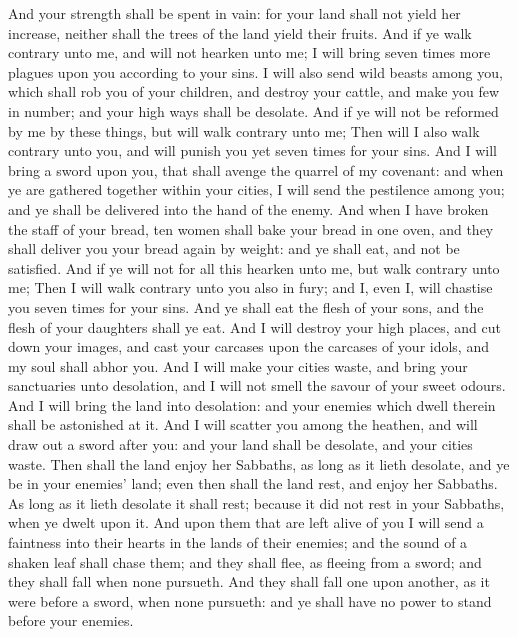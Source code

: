 \begin{biblechapter}
\verse And your strength shall be spent in vain: for your land shall not yield her increase, neither shall the trees of the land yield their fruits.
\verse And if ye walk contrary unto me, and will not hearken unto me; I will bring seven times more plagues upon you according to your sins.
\verse I will also send wild beasts among you, which shall rob you of your children, and destroy your cattle, and make you few in number; and your high ways shall be desolate.
\verse And if ye will not be reformed by me by these things, but will walk contrary unto me;
\verse Then will I also walk contrary unto you, and will punish you yet seven times for your sins.
\verse And I will bring a sword upon you, that shall avenge the quarrel of my covenant: and when ye are gathered together within your cities, I will send the pestilence among you; and ye shall be delivered into the hand of the enemy.
\verse And when I have broken the staff of your bread, ten women shall bake your bread in one oven, and they shall deliver you your bread again by weight: and ye shall eat, and not be satisfied.
\verse And if ye will not for all this hearken unto me, but walk contrary unto me;
\verse Then I will walk contrary unto you also in fury; and I, even I, will chastise you seven times for your sins.
\verse And ye shall eat the flesh of your sons, and the flesh of your daughters shall ye eat.
\verse And I will destroy your high places, and cut down your images, and cast your carcases upon the carcases of your idols, and my soul shall abhor you.
\verse And I will make your cities waste, and bring your sanctuaries unto desolation, and I will not smell the savour of your sweet odours.
\verse And I will bring the land into desolation: and your enemies which dwell therein shall be astonished at it.
\verse And I will scatter you among the heathen, and will draw out a sword after you: and your land shall be desolate, and your cities waste.
\verse Then shall the land enjoy her Sabbaths, as long as it lieth desolate, and ye be in your enemies' land; even then shall the land rest, and enjoy her Sabbaths.
\verse As long as it lieth desolate it shall rest; because it did not rest in your Sabbaths, when ye dwelt upon it.
\verse And upon them that are left alive of you I will send a faintness into their hearts in the lands of their enemies; and the sound of a shaken leaf shall chase them; and they shall flee, as fleeing from a sword; and they shall fall when none pursueth.
\verse And they shall fall one upon another, as it were before a sword, when none pursueth: and ye shall have no power to stand before your enemies.

\end{biblechapter}
